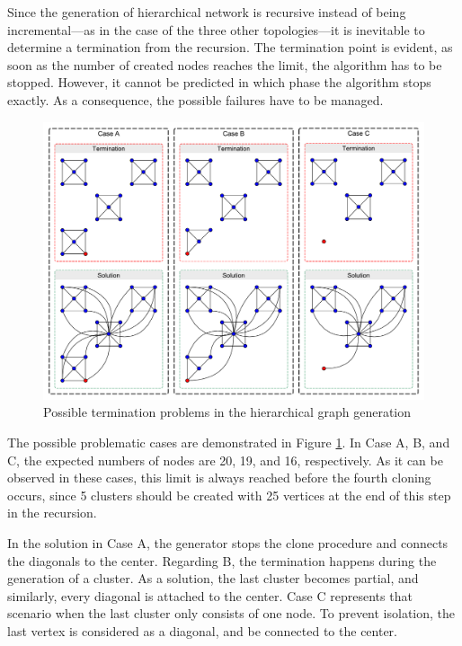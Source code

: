 Since the generation of hierarchical network is recursive instead of being incremental---as in the case of the three other topologies---it is inevitable to determine a termination from the recursion. The termination point is evident, as soon as the number of created nodes reaches the limit, the algorithm has to be stopped. However, it cannot be predicted in which phase the algorithm stops exactly. As a consequence, the possible failures have to be managed.

\begin{figure}[!ht]
	\centering
	\includegraphics[width=150mm, keepaspectratio]{figures/hierarchical.pdf}
	\caption{Possible termination problems in the hierarchical graph generation}
	\label{fig:hierarchical_problems}
\end{figure}

The possible problematic cases are demonstrated in Figure \ref{fig:hierarchical_problems}. In \textsf{Case A}, \textsf{B}, and \textsf{C}, the expected numbers of nodes are 20, 19, and 16, respectively. As it can be observed in these cases, this limit is always reached before the fourth cloning occurs, since 5 clusters should be created with 25 vertices at the end of this step in the recursion.

In the solution in \textsf{Case A}, the generator stops the clone procedure and connects the diagonals to the center. Regarding \textsf{B}, the termination happens during the generation of a cluster. As a solution, the last cluster becomes partial, and similarly, every diagonal is attached to the center. \textsf{Case C} represents that scenario when the last cluster only consists of one node. To prevent isolation, the last vertex is considered as a diagonal, and be connected to the center.

